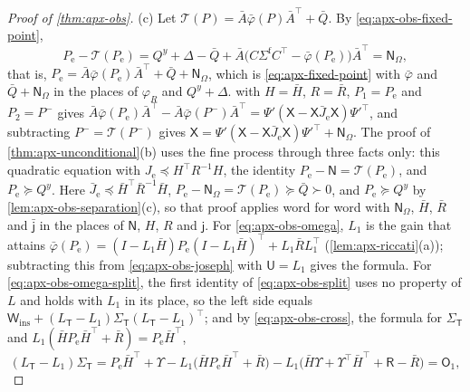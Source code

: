 \begin{proof}[Proof of \cref{thm:apx-obs}]
(c) Let $\mathcal T(P)=\bar A\bar\varphi(P)\bar A^\top+\bar Q$. By \eqref{eq:apx-obs-fixed-point},
\begin{equation*}
P_{\mathrm e}-\mathcal T(P_{\mathrm e})=Q^y+\Delta-\bar Q+\bar A\bigl(C\Sigma^{\mathrm f}C^\top-\bar\varphi(P_{\mathrm e})\bigr)\bar A^\top=\mathsf N_\Omega ,
\end{equation*}
that is, $P_{\mathrm e}=\bar A\bar\varphi(P_{\mathrm e})\bar A^\top+\bar Q+\mathsf N_\Omega$, which is \cref{eq:apx-fixed-point} with $\bar\varphi$ and $\bar Q+\mathsf N_\Omega$ in the places of $\varphi_R$ and $Q^y+\Delta$.  with $H=\bar H$, $R=\bar R$, $P_1=P_{\mathrm e}$ and $P_2=P^-$ gives $\bar A\bar\varphi(P_{\mathrm e})\bar A^\top-\bar A\bar\varphi(P^-)\bar A^\top=\Psi'(\mathsf X-\mathsf X\bar J_{\mathrm e}\mathsf X)\Psi'^\top$, and subtracting $P^-=\mathcal T(P^-)$ gives $\mathsf X=\Psi'(\mathsf X-\mathsf X\bar J_{\mathrm e}\mathsf X)\Psi'^\top+\mathsf N_\Omega$. The proof of \cref{thm:apx-unconditional}(b) uses the fine process through three facts only: this quadratic equation with $J_{\mathrm e}\preceq H^\top R^{-1}H$, the identity $P_{\mathrm e}-\mathsf N=\mathcal T(P_{\mathrm e})$, and $P_{\mathrm e}\succeq Q^y$. Here $\bar J_{\mathrm e}\preceq\bar H^\top\bar R^{-1}\bar H$, $P_{\mathrm e}-\mathsf N_\Omega=\mathcal T(P_{\mathrm e})\succeq\bar Q\succ0$, and $P_{\mathrm e}\succeq Q^y$ by \cref{lem:apx-obs-separation}(c), so that proof applies word for word with $\mathsf N_\Omega$, $\bar H$, $\bar R$ and $\bar{\mathsf j}$ in the places of $\mathsf N$, $H$, $R$ and $\mathsf j$. For \eqref{eq:apx-obs-omega}, $L_1$ is the gain that attains $\bar\varphi(P_{\mathrm e})=(I-L_1\bar H)P_{\mathrm e}(I-L_1\bar H)^\top+L_1\bar RL_1^\top$ (\cref{lem:apx-riccati}(a)); subtracting this from \eqref{eq:apx-obs-joseph} with $\mathsf U=L_1$ gives the formula. For \eqref{eq:apx-obs-omega-split}, the first identity of \eqref{eq:apx-obs-split} uses no property of $L$ and holds with $L_1$ in its place, so the left side equals $\mathsf W_{\mathrm{ins}}+(L_{\mathsf T}-L_1)\Sigma_{\mathsf T}(L_{\mathsf T}-L_1)^\top$; and by \eqref{eq:apx-obs-cross}, the formula for $\Sigma_{\mathsf T}$ and $L_1(\bar HP_{\mathrm e}\bar H^\top+\bar R)=P_{\mathrm e}\bar H^\top$,
\begin{equation*}
(L_{\mathsf T}-L_1)\Sigma_{\mathsf T}=P_{\mathrm e}\bar H^\top+\Upsilon-L_1\bigl(\bar HP_{\mathrm e}\bar H^\top+\bar R\bigr)-L_1\bigl(\bar H\Upsilon+\Upsilon^\top\bar H^\top+\mathsf R-\bar R\bigr)=\mathsf O_1 ,
\end{equation*}

\end{proof}
